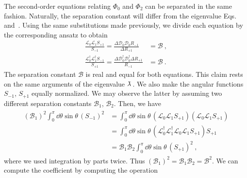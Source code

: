 The second-order equations relating $\Phi_0$ and $\Phi_2$ can be separated in the same fashion. Naturally, the separation constant will differ from the eigenvalue Eqs.~ and~.
Using the same substitutions made previously, we divide each equation by the corresponding ansatz to obtain
\begin{align}
    \label{eq3:separationB}
    \frac{\mathscr{L}_0 \mathscr{L}_1 S_{+1}}{S_{-1}} = \frac{\Delta \mathscr{D}_0 \mathscr{D}_0 R_{-1}}{\Delta R_{+1}} &= \mathscr{B} ~, \\
    \label{eq3:separationBdagger}
    \frac{\mathscr{L}^\dagger_0 \mathscr{L}^\dagger_1 S_{-1}}{S_{+1}} = \frac{\Delta \mathscr{D}^\dagger_0 \mathscr{D}^\dagger_0 \Delta R_{+1}}{R_{-1}} &= \mathscr{B} ~.
\end{align}
The separation constant $\mathscr{B}$ is real and equal for both equations. This claim rests on the same arguments of the eigenvalue $\lambdabar$. We also make the angular functions $S_{-1}$, $S_{+1}$ equally normalized. We may observe the latter by assuming two different separation constants $\mathscr{B}_1$, $\mathscr{B}_2$. Then, we have
\begin{align}
    \begin{split}
        (\mathscr{B}_1)^2 \int_0^\pi \dd\theta \sin\theta \, (S_{-1})^2 &=
        \int_0^\pi \dd\theta \sin\theta \, ( \mathscr{L}_0 \mathscr{L}_1  S_{+1} )( \mathscr{L}_0 \mathscr{L}_1  S_{+1} ) \\
        &= \int_0^\pi \dd\theta \sin\theta \, ( \mathscr{L}^\dagger_0 \mathscr{L}^\dagger_1 \mathscr{L}_0 \mathscr{L}_1  S_{+1} ) S_{+1} \\
        &=  \mathscr{B}_1 \mathscr{B}_2 \int_0^\pi \dd\theta \sin\theta \, (S_{+1})^2 ~,
    \end{split}
\end{align}
where we used integration by parts twice.
Thus $(\mathscr{B}_1)^2 = \mathscr{B}_1 \mathscr{B}_2 = \mathscr{B}^2$.
We can compute the coefficient by computing the operation
